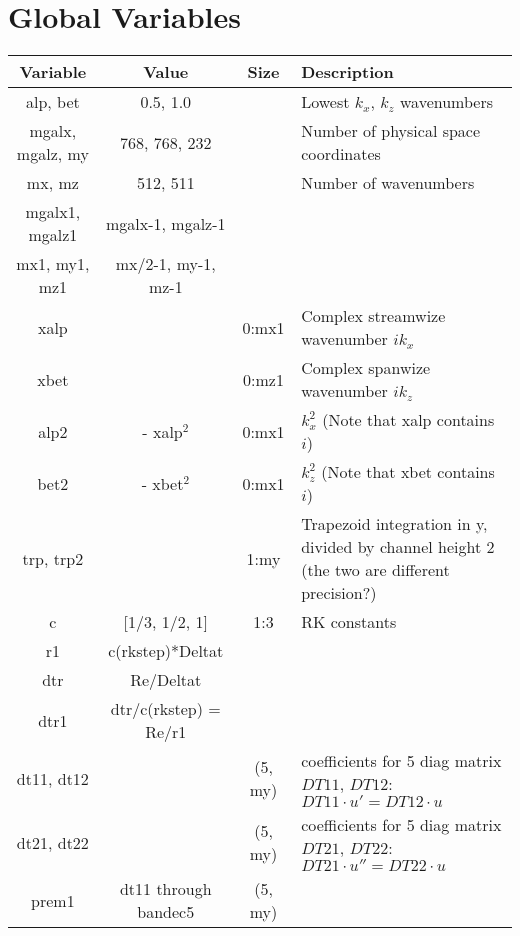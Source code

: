 \documentclass[titlepage,12pt,letter]{article}
\numberwithin{equation}{section}
\begin{document}
\section{Global Variables}
\begin{table}[H]
	\centering 
	\renewcommand{\arraystretch}{1.5} 
	\begin{tabular}{c|c|c|m{8cm}}
		Variable&Value&Size&Description \\ \hline
		alp, bet& 0.5, 1.0&& Lowest $k_x$, $k_z$ wavenumbers\\ \hline
		mgalx, mgalz, my& 768, 768, 232&& Number of physical space coordinates \\
		mx, mz& 512, 511&& Number of wavenumbers\\ \hdashline
		mgalx1, mgalz1& mgalx-1, mgalz-1&&\\
		mx1, my1, mz1&mx/2-1, my-1, mz-1&&\\ \hline
		xalp&	&0:mx1	&Complex streamwize wavenumber $ik_x$\\			
		xbet&	&0:mz1	&Complex spanwize wavenumber $ik_z$\\		\hline
		alp2& - xalp$^2$ &0:mx1& $k_x^2$ (Note that xalp contains $i$)\\
		bet2& - xbet$^2$ &0:mx1& $k_z^2$ (Note that xbet contains $i$)\\ \hline
		trp, trp2&	&1:my&Trapezoid integration in y, divided by channel height 2 (the two are different precision?)\\ \hline
		c & [1/3, 1/2, 1]&1:3& RK constants \\
		r1& c(rkstep)*Deltat& &\\
		dtr& Re/Deltat& & \\
		dtr1& dtr/c(rkstep) = Re/r1 & & \\ \hline		
		dt11, dt12&&(5, my)&coefficients for 5 diag matrix $DT11$, $DT12$:	$DT11\cdot u' = DT12\cdot u$ \\
		dt21, dt22&&(5, my)&coefficients for 5 diag matrix $DT21$, $DT22$: $DT21\cdot u'' = DT22\cdot u$ \\ 
		prem1& dt11 through bandec5&(5, my) &\\\hline
		
	\end{tabular} 
\end{table} 
\end{document}
